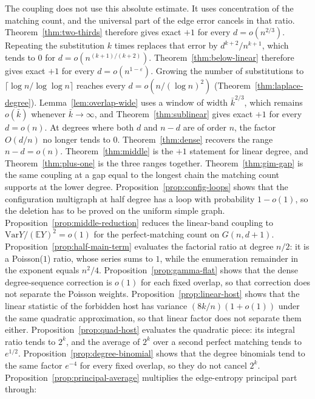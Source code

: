 \documentclass[11pt]{article}
\newcommand{\EE}{\mathbb{E}}
\newcommand{\Var}{\mathrm{Var}}
\begin{document}
The coupling does not use this absolute estimate.
It uses concentration of the matching count, and the universal part of the edge error cancels in that ratio.
Theorem~\ref{thm:two-thirds} therefore gives exact \(+1\) for every \(d=o(n^{2/3})\).
Repeating the substitution \(k\) times replaces that error by \(d^{k+2}/n^{k+1}\), which
tends to \(0\) for \(d=o(n^{(k+1)/(k+2)})\). Theorem~\ref{thm:below-linear} therefore
gives exact \(+1\) for every \(d=o(n^{1-\varepsilon})\).
Growing the number of substitutions to \(\lceil\log n/\log\log n\rceil\) reaches
every \(d=o(n/(\log n)^2)\) (Theorem~\ref{thm:laplace-degree}).
Lemma~\ref{lem:overlap-wide} uses a window of width \(\bar k^{2/3}\), which remains
\(o(\bar k)\) whenever \(\bar k\to\infty\), and Theorem~\ref{thm:sublinear} gives
exact \(+1\) for every \(d=o(n)\). At degrees where both \(d\) and \(n-d\) are of
order \(n\), the factor \(O(d/n)\) no longer tends to \(0\).
Theorem~\ref{thm:dense} recovers the range \(n-d=o(n)\).
Theorem~\ref{thm:middle} is the \(+1\) statement for linear degree, and
Theorem~\ref{thm:plus-one} is the three ranges together.
Theorem~\ref{thm:gim-gap} is the same coupling at a gap equal to the longest chain the matching count supports at the lower degree.
Proposition~\ref{prop:config-loops} shows that the configuration multigraph at half
degree has a loop with probability \(1-o(1)\), so the deletion has to be proved
on the uniform simple graph.
Proposition~\ref{prop:middle-reduction} reduces the linear-band coupling to
\(\Var Y/(\EE Y)^2=o(1)\) for the perfect-matching count on \(G(n,d+1)\).
Proposition~\ref{prop:half-main-term} evaluates the factorial ratio at degree \(n/2\):
it is a Poisson(\(1\)) ratio, whose series sums to \(1\), while the enumeration
remainder in the exponent equals \(n^2/4\).
Proposition~\ref{prop:gamma-flat} shows that the dense degree-sequence correction
is \(o(1)\) for each fixed overlap, so that correction does not separate the Poisson weights.
Proposition~\ref{prop:linear-host} shows that the linear statistic of the forbidden host
has variance \((8k/n)(1+o(1))\) under the same quadratic approximation, so that linear factor
does not separate them either.
Proposition~\ref{prop:quad-host} evaluates the quadratic piece: its integral ratio tends to \(2^k\),
and the average of \(2^k\) over a second perfect matching tends to \(e^{1/2}\).
Proposition~\ref{prop:degree-binomial} shows that the degree binomials tend to the same
factor \(e^{-4}\) for every fixed overlap, so they do not cancel \(2^k\).
Proposition~\ref{prop:principal-average} multiplies the edge-entropy principal part through:
\end{document}
